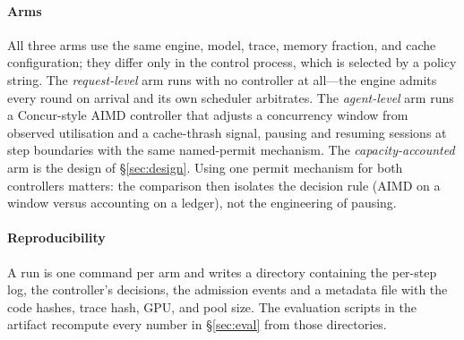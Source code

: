 \paragraph{Arms} All three arms use the same engine, model, trace, memory fraction, and
cache configuration; they differ only in the control process, which is selected by a policy
string. The \emph{request-level} arm runs with no controller at all---the engine admits
every round on arrival and its own scheduler arbitrates. The \emph{agent-level} arm runs a
Concur-style AIMD controller \cite{concur} that adjusts a concurrency window from observed
utilisation and a cache-thrash signal, pausing and resuming sessions at step boundaries
with the same named-permit mechanism. The \emph{capacity-accounted} arm is the design of
\S\ref{sec:design}. Using one permit mechanism for both controllers matters: the comparison
then isolates the decision rule (AIMD on a window versus accounting on a ledger), not the
engineering of pausing.

\paragraph{Reproducibility} A run is one command per arm and writes a directory containing
the per-step log, the controller's decisions, the admission events and a metadata file with
the code hashes, trace hash, GPU, and pool size. The evaluation scripts in the artifact
recompute every number in \S\ref{sec:eval} from those directories.
